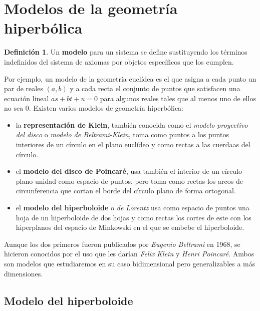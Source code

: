 \documentclass{article}
\theoremstyle{plain}
\theoremstyle{definition}
\newtheorem{definition}{Definición}
\theoremstyle{remark}
\begin{document}
\section{Modelos de la geometría hiperbólica}
\begin{definition}
  Un \textbf{modelo} para un sistema se define sustituyendo los
  términos indefinidos del sistema de axiomas por objetos específicos
  que los cumplen.
\end{definition}

Por ejemplo, un modelo de la geometría euclídea es el que asigna a
cada punto un par de reales $(a,b)$ y a cada recta el conjunto de
puntos que satisfacen una ecuación lineal $as+bt+u = 0$ para algunos
reales tales que al menos uno de ellos no sea $0$. Existen varios
modelos de geometría hiperbólica:

\begin{itemize}
  
\item la \textbf{representación de Klein}, también conocida como el
  \textit{modelo proyectivo del disco} o \textit{modelo de
    Beltrami-Klein}, toma como puntos a los puntos interiores de
  un círculo en el plano euclídeo y como rectas a las cuerdaas del
  círculo.
  
\item el \textbf{modelo del disco de Poincaré}, usa también el
  interior de un círculo plano unidad como espacio de puntos,
  pero toma como rectas los arcos de circunferencia que cortan el
  borde del círculo plano de forma ortogonal.
  
\item el \textbf{modelo del hiperboloide} o \textit{de Lorentz} usa
  como espacio de puntos una hoja de un hiperboloide de dos hojas
  y como rectas los cortes de este con los hiperplanos del espacio
  de Minkowski en el que se embebe el hiperboloide.
  
\end{itemize}

Aunque los dos primeros fueron publicados por \textit{Eugenio
  Beltrami} en 1968, se hicieron conocidos por el uso que les
darían \textit{Felix Klein} y \textit{Henri Poincaré}. Ambos
son modelos que estudiaremos en su caso bidimensional pero
generalizables a más dimensiones.

\subsection{Modelo del hiperboloide}
\end{document}
